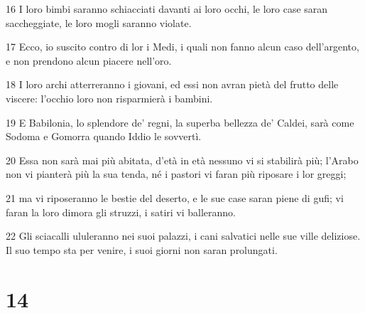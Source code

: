 \par 16 I loro bimbi saranno schiacciati davanti ai loro occhi, le loro case saran saccheggiate, le loro mogli saranno violate.
\par 17 Ecco, io suscito contro di lor i Medi, i quali non fanno alcun caso dell'argento, e non prendono alcun piacere nell'oro.
\par 18 I loro archi atterreranno i giovani, ed essi non avran pietà del frutto delle viscere: l'occhio loro non risparmierà i bambini.
\par 19 E Babilonia, lo splendore de' regni, la superba bellezza de' Caldei, sarà come Sodoma e Gomorra quando Iddio le sovvertì.
\par 20 Essa non sarà mai più abitata, d'età in età nessuno vi si stabilirà più; l'Arabo non vi pianterà più la sua tenda, né i pastori vi faran più riposare i lor greggi;
\par 21 ma vi riposeranno le bestie del deserto, e le sue case saran piene di gufi; vi faran la loro dimora gli struzzi, i satiri vi balleranno.
\par 22 Gli sciacalli ululeranno nei suoi palazzi, i cani salvatici nelle sue ville deliziose. Il suo tempo sta per venire, i suoi giorni non saran prolungati.

\chapter{14}

